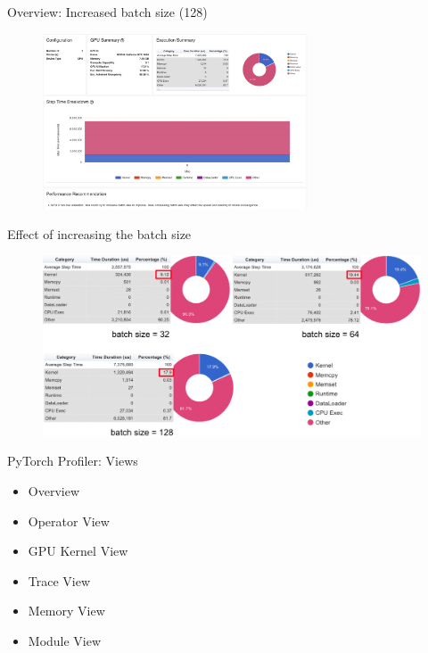 \documentclass[compress,aspectratio=169]{beamer}
\begin{document}
\begin{frame}{Overview: Increased batch size (128)}
	\vspace{-1em}
\begin{center}
    \begin{figure}
        \includegraphics[width=0.7\textwidth]{../../data/scap_gtx1080_profiler-torch_batch-size-128_14650759}
    \end{figure}
    \end{center}

\end{frame}


\begin{frame}{Effect of increasing the batch size}
    \vspace{-0.5em}
\begin{center}
    \begin{figure}
        \includegraphics[width=1\textwidth]{../../data/scap_gtx1080_profiler-torch_comparison-batch-size}
    \end{figure}
    \end{center}

\end{frame}

\begin{frame}{PyTorch Profiler: Views}
\begin{itemize}
    \item Overview
    \item Operator View
    \item GPU Kernel View
    \item Trace View
    \item Memory View
    \item Module View
\end{itemize}
\end{frame}
\end{document}
